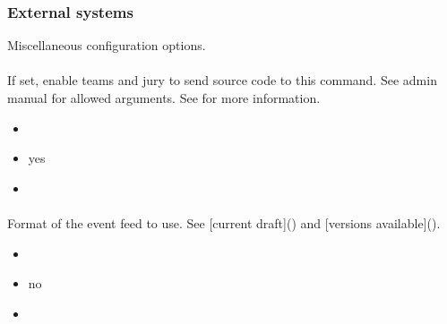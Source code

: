 \documentclass[a4paper,10pt,english,openany]{sphinxmanual}
\begin{document}
\subsubsection{External systems}
\label{\detokenize{configuration-reference:external-systems}}
\sphinxAtStartPar
Miscellaneous configuration options.


\paragraph{}
\label{\detokenize{configuration-reference:print-command}}
\sphinxAtStartPar
If set, enable teams and jury to send source code to this command. See admin manual for allowed arguments. See {\hyperref[\detokenize{config-advanced:printing}]{}} for more information.
\begin{itemize}
\item {} 
\sphinxAtStartPar
{} 

\item {} 
\sphinxAtStartPar
{} yes

\item {} 
\sphinxAtStartPar
{} \sphinxcode{\sphinxupquote{\textquotesingle{}\textquotesingle{}}}

\end{itemize}


\paragraph{}
\label{\detokenize{configuration-reference:event-feed-format}}
\sphinxAtStartPar
Format of the event feed to use. See {[}current draft{]}() and {[}versions available{]}().
\begin{itemize}
\item {} 
\sphinxAtStartPar
{} 

\item {} 
\sphinxAtStartPar
{} no

\item {} 
\sphinxAtStartPar
{}

\begin{sphinxVerbatim}[commandchars=\\\{\}]
\end{sphinxVerbatim}

\end{itemize}
\end{document}

